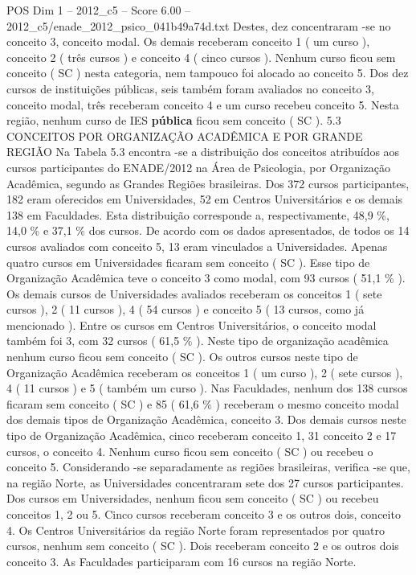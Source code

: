 \begin{textsample}{POS Dim 1 – 2012\_c5 – Score 6.00 – 2012\_c5/enade\_2012\_psico\_041b49a74d.txt}
Destes, dez concentraram -se no conceito 3, conceito modal.
Os demais receberam conceito 1 ( um curso ), conceito 2 ( três cursos ) e conceito 4 ( cinco cursos ).
Nenhum curso ficou sem conceito ( SC ) nesta categoria, nem tampouco foi alocado ao conceito 5.
Dos dez cursos de instituições públicas, seis também foram avaliados no conceito 3, conceito modal, três receberam conceito 4 e um curso recebeu conceito 5.
Nesta região, nenhum curso de IES \textbf{pública} ficou sem conceito ( SC ). 5.3 CONCEITOS POR ORGANIZAÇÃO ACADÊMICA E POR GRANDE REGIÃO Na Tabela 5.3 encontra -se a distribuição dos conceitos atribuídos aos cursos participantes do ENADE/2012 na Área de Psicologia, por Organização Acadêmica, segundo as Grandes Regiões brasileiras.
Dos 372 cursos participantes, 182 eram oferecidos em Universidades, 52 em Centros Universitários e os demais 138 em Faculdades.
Esta distribuição corresponde a, respectivamente, 48,9 \%, 14,0 \% e 37,1 \% dos cursos.
De acordo com os dados apresentados, de todos os 14 cursos avaliados com conceito 5, 13 eram vinculados a Universidades.
Apenas quatro cursos em Universidades ficaram sem conceito ( SC ).
Esse tipo de Organização Acadêmica teve o conceito 3 como modal, com 93 cursos ( 51,1 \% ).
Os demais cursos de Universidades avaliados receberam os conceitos 1 ( sete cursos ), 2 ( 11 cursos ), 4 ( 54 cursos ) e conceito 5 ( 13 cursos, como já mencionado ).
Entre os cursos em Centros Universitários, o conceito modal também foi 3, com 32 cursos ( 61,5 \% ).
Neste tipo de organização acadêmica nenhum curso ficou sem conceito ( SC ).
Os outros cursos neste tipo de Organização Acadêmica receberam os conceitos 1 ( um curso ), 2 ( sete cursos ), 4 ( 11 cursos ) e 5 ( também um curso ).
Nas Faculdades, nenhum dos 138 cursos ficaram sem conceito ( SC ) e 85 ( 61,6 \% ) receberam o mesmo conceito modal dos demais tipos de Organização Acadêmica, conceito 3.
Dos demais cursos neste tipo de Organização Acadêmica, cinco receberam conceito 1, 31 conceito 2 e 17 cursos, o conceito 4.
Nenhum curso ficou sem conceito ( SC ) ou recebeu o conceito 5.
Considerando -se separadamente as regiões brasileiras, verifica -se que, na região Norte, as Universidades concentraram sete dos 27 cursos participantes.
Dos cursos em Universidades, nenhum ficou sem conceito ( SC ) ou recebeu conceitos 1, 2 ou 5.
Cinco cursos receberam conceito 3 e os outros dois, conceito 4.
Os Centros Universitários da região Norte foram representados por quatro cursos, nenhum sem conceito ( SC ).
Dois receberam conceito 2 e os outros dois conceito 3.
As Faculdades participaram com 16 cursos na região Norte.

\end{textsample}
